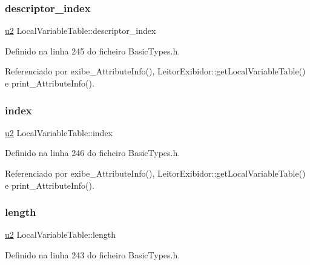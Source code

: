 \subsubsection{\texorpdfstring{descriptor\+\_\+index}{descriptor\_index}}
{\footnotesize\ttfamily \hyperlink{BasicTypes_8h_a732cde1300aafb73b0ea6c2558a7a54f}{u2} Local\+Variable\+Table\+::descriptor\+\_\+index}



Definido na linha 245 do ficheiro Basic\+Types.\+h.



Referenciado por exibe\+\_\+\+Attribute\+Info(), Leitor\+Exibidor\+::get\+Local\+Variable\+Table() e print\+\_\+\+Attribute\+Info().

\mbox{\label{structLocalVariableTable_ab50a3227c68569b6a040306b1f7ebfd1}} 
\subsubsection{\texorpdfstring{index}{index}}
{\footnotesize\ttfamily \hyperlink{BasicTypes_8h_a732cde1300aafb73b0ea6c2558a7a54f}{u2} Local\+Variable\+Table\+::index}



Definido na linha 246 do ficheiro Basic\+Types.\+h.



Referenciado por exibe\+\_\+\+Attribute\+Info(), Leitor\+Exibidor\+::get\+Local\+Variable\+Table() e print\+\_\+\+Attribute\+Info().

\mbox{\label{structLocalVariableTable_a0027db27baa11c80536bc1042490709f}} 
\subsubsection{\texorpdfstring{length}{length}}
{\footnotesize\ttfamily \hyperlink{BasicTypes_8h_a732cde1300aafb73b0ea6c2558a7a54f}{u2} Local\+Variable\+Table\+::length}



Definido na linha 243 do ficheiro Basic\+Types.\+h.



